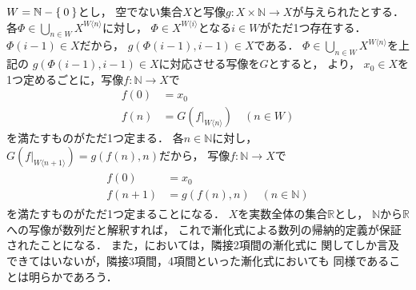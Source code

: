 \documentclass[11pt,a4paper]{ltjsarticle} %
\theoremstyle{mystyle} %
\begin{document}
$W = \mathbb{N} - \Set{0}$とし，
空でない集合$X$と写像$g \colon X \times \mathbb{N} \longrightarrow X$が与えられたとする．
各$\varPhi \in \bigcup _{n \in W} X^{W \langle n \rangle}$に対し，
$\varPhi \in X^{W \langle i \rangle}$となる$i \in W$がただ1つ存在する．
$\varPhi (i-1) \in X $だから，
$g( \varPhi (i-1) , i-1) \in X$である．
$\varPhi \in \bigcup_{n \in W} X^{W \langle n \rangle }$を上記の
$g (\varPhi (i-1) , i-1) \in X$に対応させる写像を$G$とすると，
より，
$x_0 \in X$を1つ定めるごとに，写像$f \colon \mathbb{N} \longrightarrow X$で
\begin{align*}
  f(0) & = x_0 \\
  f(n) & = G \left( f|_{W \langle n \rangle} \right) \quad (n \in W)
\end{align*}
を満たすものがただ1つ定まる．
各$n \in \mathbb{N}$に対し，$G \left( f|_{W \langle n+1 \rangle} \right) 
= g (f(n), n)$だから，
写像$f \colon \mathbb{N} \longrightarrow X$で
\begin{align}
  \begin{aligned}
    f(0) & = x_0 \\
    f(n+1) & = g(f(n),n) \quad (n \in \mathbb{N})
  \end{aligned}
  \label{eq:zenkasikimap}
\end{align}
を満たすものがただ1つ定まることになる．
$X$を実数全体の集合$\mathbb{R}$とし，
$\mathbb{N}$から$\mathbb{R}$への写像が数列だと解釈すれば，
これで漸化式による数列の帰納的定義が保証されたことになる．
また，においては，隣接2項間の漸化式に
関してしか言及できてはいないが，隣接3項間，4項間といった漸化式においても
同様であることは明らかであろう．

%
\printbibliography[title=参考文献]
\end{document}

